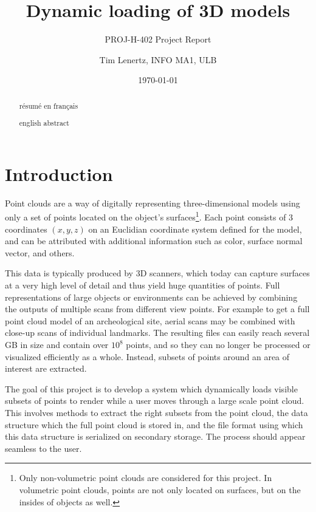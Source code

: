 \documentclass[a4paper,11pt,abstracton,notitlepage]{scrreprt}
\title{Dynamic loading of 3D models}
\subtitle{PROJ-H-402 Project Report}
\author{Tim Lenertz, INFO MA1, ULB}
\date{\today}
\begin{document}
\maketitle{}

\vspace{3cm}
\renewcommand{\abstractname}{Résumé}
\begin{abstract}
résumé en français
\end{abstract}

\vspace{2cm}
\renewcommand{\abstractname}{Abstract}
\begin{abstract}
english abstract
\end{abstract}

\tableofcontents{}

\chapter{Introduction}
Point clouds are a way of digitally representing three-dimensional models using only a set of points located on the object's surfaces\footnote{Only non-volumetric point clouds are considered for this project. In volumetric point clouds, points are not only located on surfaces, but on the insides of objects as well.}. Each point consists of 3 coordinates $(x, y, z)$ on an Euclidian coordinate system defined for the model, and can be attributed with additional information such as color, surface normal vector, and others.

This data is typically produced by 3D scanners, which today can capture surfaces at a very high level of detail and thus yield huge quantities of points. Full representations of large objects or environments can be achieved by combining the outputs of multiple scans from different view points. For example to get a full point cloud model of an archeological site, aerial scans may be combined with close-up scans of individual landmarks. The resulting files can easily reach several GB in size and contain over $10^{8}$ points, and so they can no longer be processed or visualized efficiently as a whole. Instead, subsets of points around an area of interest are extracted.

The goal of this project is to develop a system which dynamically loads visible subsets of points to render while a user moves through a large scale point cloud. This involves methods to extract the right subsets from the point cloud, the data structure which the full point cloud is stored in, and the file format using which this data structure is serialized on secondary storage. The process should appear seamless to the user.
\end{document}
